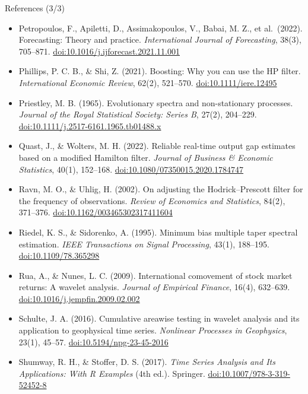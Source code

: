 \begin{frame}{References (3/3)}
\itemsize{\tiny}
\begin{itemize}
    \item Petropoulos, F., Apiletti, D., Assimakopoulos, V., Babai, M. Z., et al.\ (2022). Forecasting: Theory and practice. \textit{International Journal of Forecasting}, 38(3), 705--871. \href{https://doi.org/10.1016/j.ijforecast.2021.11.001}{doi:10.1016/j.ijforecast.2021.11.001}
    \item Phillips, P. C. B., \& Shi, Z. (2021). Boosting: Why you can use the HP filter. \textit{International Economic Review}, 62(2), 521--570. \href{https://doi.org/10.1111/iere.12495}{doi:10.1111/iere.12495}
    \item Priestley, M. B. (1965). Evolutionary spectra and non-stationary processes. \textit{Journal of the Royal Statistical Society: Series B}, 27(2), 204--229. \href{https://doi.org/10.1111/j.2517-6161.1965.tb01488.x}{doi:10.1111/j.2517-6161.1965.tb01488.x}
    \item Quast, J., \& Wolters, M. H. (2022). Reliable real-time output gap estimates based on a modified Hamilton filter. \textit{Journal of Business \& Economic Statistics}, 40(1), 152--168. \href{https://doi.org/10.1080/07350015.2020.1784747}{doi:10.1080/07350015.2020.1784747}
    \item Ravn, M. O., \& Uhlig, H. (2002). On adjusting the Hodrick--Prescott filter for the frequency of observations. \textit{Review of Economics and Statistics}, 84(2), 371--376. \href{https://doi.org/10.1162/003465302317411604}{doi:10.1162/003465302317411604}
    \item Riedel, K. S., \& Sidorenko, A. (1995). Minimum bias multiple taper spectral estimation. \textit{IEEE Transactions on Signal Processing}, 43(1), 188--195. \href{https://doi.org/10.1109/78.365298}{doi:10.1109/78.365298}
    \item Rua, A., \& Nunes, L. C. (2009). International comovement of stock market returns: A wavelet analysis. \textit{Journal of Empirical Finance}, 16(4), 632--639. \href{https://doi.org/10.1016/j.jempfin.2009.02.002}{doi:10.1016/j.jempfin.2009.02.002}
    \item Schulte, J. A. (2016). Cumulative areawise testing in wavelet analysis and its application to geophysical time series. \textit{Nonlinear Processes in Geophysics}, 23(1), 45--57. \href{https://doi.org/10.5194/npg-23-45-2016}{doi:10.5194/npg-23-45-2016}
    \item Shumway, R. H., \& Stoffer, D. S. (2017). \textit{Time Series Analysis and Its Applications: With R Examples} (4th ed.). Springer. \href{https://doi.org/10.1007/978-3-319-52452-8}{doi:10.1007/978-3-319-52452-8}

\end{itemize}
\end{frame}
